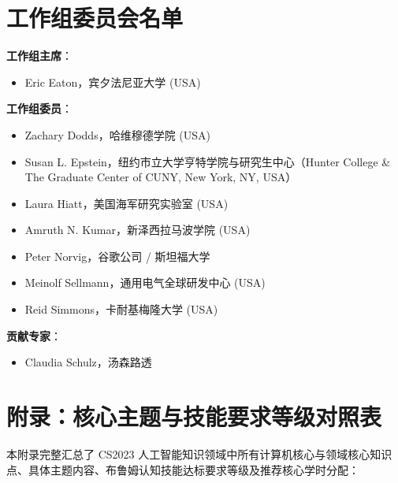 \section{工作组委员会名单}

\textbf{工作组主席}：
\begin{itemize}
    \item Eric Eaton，宾夕法尼亚大学 (USA)
\end{itemize}

\textbf{工作组委员}：
\begin{itemize}
    \item Zachary Dodds，哈维穆德学院 (USA)
    \item Susan L. Epstein，纽约市立大学亨特学院与研究生中心（Hunter College \& The Graduate Center of CUNY, New York, NY, USA）
    \item Laura Hiatt，美国海军研究实验室 (USA)
    \item Amruth N. Kumar，新泽西拉马波学院 (USA)
    \item Peter Norvig，谷歌公司 / 斯坦福大学
    \item Meinolf Sellmann，通用电气全球研发中心 (USA)
    \item Reid Simmons，卡耐基梅隆大学 (USA)
\end{itemize}

\textbf{贡献专家}：
\begin{itemize}
    \item Claudia Schulz，汤森路透
\end{itemize}

\clearpage
\onecolumn
\section{附录：核心主题与技能要求等级对照表}

本附录完整汇总了 CS2023 人工智能知识领域中所有计算机核心与领域核心知识点、具体主题内容、布鲁姆认知技能达标要求等级及推荐核心学时分配：

